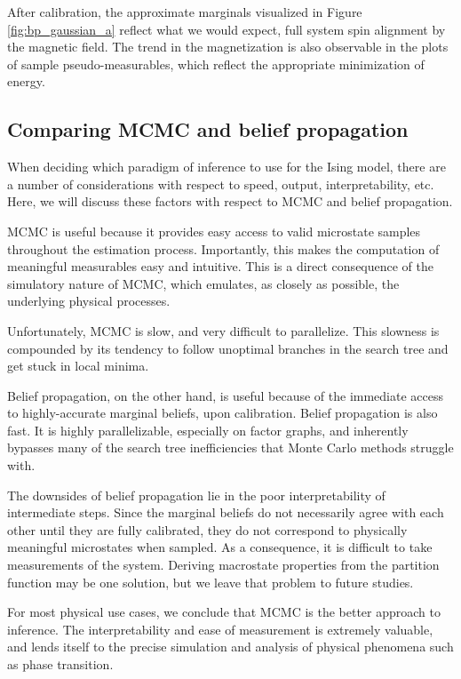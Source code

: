 \documentclass{article}
\begin{document}
After calibration, the approximate marginals visualized in Figure
\ref{fig:bp_gaussian_a} reflect what we would expect, full system spin alignment 
by the magnetic field. 
The trend in the magnetization is also observable in the plots of sample 
pseudo-measurables, which reflect the appropriate minimization of energy. 

\subsection{Comparing MCMC and belief propagation}

When deciding which paradigm of inference to use for the Ising model, there are 
a number of considerations with respect to speed, output, interpretability, etc. 
Here, we will discuss these factors with respect to MCMC and belief propagation. 

MCMC is useful because it provides easy access to valid microstate samples 
throughout the estimation process. 
Importantly, this makes the computation of meaningful measurables easy and 
intuitive. 
This is a direct consequence of the simulatory nature of MCMC, which emulates, 
as closely as possible, the underlying physical processes. 

Unfortunately, MCMC is slow, and very difficult to parallelize. 
This slowness is compounded by its tendency to follow unoptimal branches in the 
search tree and get stuck in local minima. 

Belief propagation, on the other hand, is useful because of the immediate access 
to highly-accurate marginal beliefs, upon calibration. 
Belief propagation is also fast. 
It is highly parallelizable, especially on factor graphs, and inherently 
bypasses many of the search tree inefficiencies that Monte Carlo methods 
struggle with. 

The downsides of belief propagation lie in the poor interpretability of 
intermediate steps. 
Since the marginal beliefs do not necessarily agree with each other until 
they are fully calibrated, they do not correspond to physically meaningful 
microstates when sampled. 
As a consequence, it is difficult to take measurements of the system. 
Deriving macrostate properties from the partition function may be one solution, 
but we leave that problem to future studies. 

For most physical use cases, we conclude that MCMC is the better approach to 
inference. 
The interpretability and ease of measurement is extremely valuable, and lends 
itself to the precise simulation and analysis of physical phenomena such as 
phase transition. 
%
%
%
%
%
\end{document}
